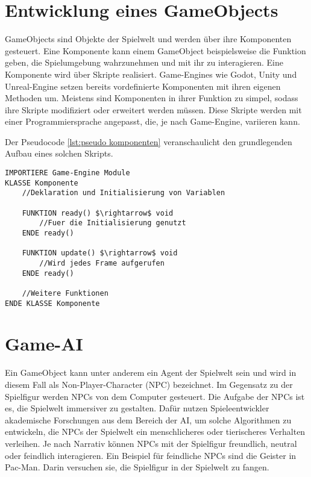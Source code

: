 \section{Entwicklung eines GameObjects}
\label{chap:komponenten}

GameObjects sind Objekte der Spielwelt und werden \"{u}ber ihre Komponenten gesteuert. Eine Komponente kann einem GameObject beispielsweise die Funktion geben, die Spielumgebung wahrzunehmen und mit ihr zu interagieren. Eine Komponente wird \"{u}ber Skripte realisiert. Game-Engines wie Godot, Unity und Unreal-Engine setzen bereits vordefinierte Komponenten mit ihren eigenen Methoden um. Meistens sind Komponenten in ihrer Funktion zu simpel, sodass ihre Skripte modifiziert oder erweitert werden m\"{u}ssen. Diese Skripte werden mit einer Programmiersprache angepasst, die, je nach Game-Engine, variieren kann.

Der Pseudocode \ref{lst:pseudo komponenten} veranschaulicht den grundlegenden Aufbau eines solchen Skripts.

\begin{lstlisting}[language=Pseudo, caption={Aufbau eines Komponenten Skripts}, mathescape=true, label={lst:pseudo komponenten}]
IMPORTIERE Game-Engine Module
KLASSE Komponente
	//Deklaration und Initialisierung von Variablen
	
	FUNKTION ready() $\rightarrow$ void
		//Fuer die Initialisierung genutzt
	ENDE ready()

	FUNKTION update() $\rightarrow$ void
		//Wird jedes Frame aufgerufen
	ENDE ready()
	
	//Weitere Funktionen
ENDE KLASSE Komponente

\end{lstlisting}

\section{Game-AI}
\label{chap:game-ai}

Ein GameObject kann unter anderem ein Agent der Spielwelt sein und wird in diesem Fall als Non-Player-Character (NPC) bezeichnet. Im Gegensatz zu der Spielfigur werden NPCs von dem Computer gesteuert. Die Aufgabe der NPCs ist es, die Spielwelt immersiver zu gestalten. Daf\"{u}r nutzen Spieleentwickler akademische Forschungen aus dem Bereich der AI, um solche Algorithmen zu entwickeln, die NPCs der Spielwelt ein menschlicheres oder tierischeres Verhalten verleihen. Je nach Narrativ k\"{o}nnen NPCs mit der Spielfigur freundlich, neutral oder feindlich interagieren. Ein Beispiel f\"{u}r feindliche NPCs sind die Geister in Pac-Man. Darin versuchen sie, die Spielfigur in der Spielwelt zu fangen.


